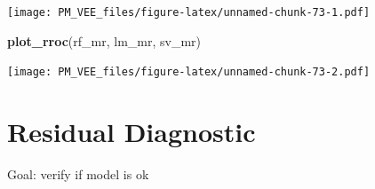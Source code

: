 \documentclass[12pt,]{krantz}
\newenvironment{Shaded}{\begin{snugshade}}{\end{snugshade}}
\newcommand{\KeywordTok}[1]{\textcolor[rgb]{0.13,0.29,0.53}{\textbf{#1}}}
\newcommand{\NormalTok}[1]{#1}
\begin{document}
\texttt{[image: PM\_VEE\_files/figure-latex/unnamed-chunk-73-1.pdf]}

\begin{Shaded}
\begin{Highlighting}[]
\KeywordTok{plot_rroc}\NormalTok{(rf_mr, lm_mr, sv_mr)}
\end{Highlighting}
\end{Shaded}

\texttt{[image: PM\_VEE\_files/figure-latex/unnamed-chunk-73-2.pdf]}

\hypertarget{residualDiagnostic}{%
\section{Residual Diagnostic}\label{residualDiagnostic}}

Goal: verify if model is ok

\citep{R-auditor}
\end{document}
